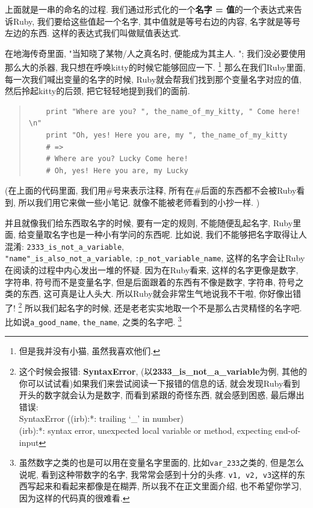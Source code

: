 上面就是一串的命名的过程. 我们通过形式化的一个\textbf{名字 = 值}的一个表达式来告诉Ruby, 我们要给这些值起一个名字, 其中值就是等号右边的内容, 名字就是等号左边的东西. 这样的表达式我们叫做赋值表达式. 

在地海传奇里面, "当知晓了某物/人之真名时, 便能成为其主人. "; 我们没必要使用那么大的杀器, 我只想在呼唤kitty的时候它能够回应一下. \footnote{但是我并没有小猫, 虽然我喜欢他们. } 那么在我们Ruby里面, 每一次我们喊出变量的名字的时候, Ruby就会帮我们找到那个变量名字对应的值, 然后拎起kitty的后颈, 把它轻轻地提到我们的面前. 

\begin{quotation}
  \begin{verbatim}
    print "Where are you? ", the_name_of_my_kitty, " Come here! \n"
    print "Oh, yes! Here you are, my ", the_name_of_my_kitty
    # =>
    # Where are you? Lucky Come here!
    # Oh, yes! Here you are, my Lucky
  \end{verbatim}
\end{quotation}

(在上面的代码里面, 我们用\#号来表示注释, 所有在\#后面的东西都不会被Ruby看到, 所以我们用它来做一些小笔记. 就像不能被老师看到的小抄一样. )

并且就像我们给东西取名字的时候, 要有一定的规则, 不能随便乱起名字, Ruby里面, 给变量取名字也是一种小有学问的东西呢. 比如说, 我们不能够把名字取得让人混淆: \texttt{2333_is_not_a_variable}, \\\texttt{"name"_is_also_not_a_variable}, \texttt{:p_not_variable_name}, 这样的名字会让Ruby在阅读的过程中内心发出一堆的怀疑. 因为在Ruby看来, 这样的名字更像是数字, 字符串, 符号而不是变量名字, 但是后面跟着的东西有不像是数字, 字符串, 符号之类的东西, 这可真是让人头大. 所以Ruby就会非常生气地说我不干啦, 你好像出错了! \footnote{这个时候会报错: \textbf{SyntaxError}, (以\textbf{2333\_is\_not\_a\_variable}为例, 其他的你可以试试看)如果我们来尝试阅读一下报错的信息的话, 就会发现Ruby看到开头的数字就会认为是数字, 而看到紧跟的奇怪东西, 就会感到困惑, 最后爆出错误: \\ SyntaxError ((irb):*: trailing `\_' in number)\\(irb):*: syntax error, unexpected local variable or method, expecting end-of-input} 所以我们起名字的时候, 还是老老实实地取一个不是那么古灵精怪的名字吧. 比如说\texttt{a_good_name}, \texttt{the_name}, 之类的名字吧. \footnote{虽然数字之类的也是可以用在变量名字里面的, 比如\texttt{var_233}之类的, 但是怎么说呢, 看到这种带数字的名字, 我常常会感到十分的头疼. \texttt{v1, v2, v3}这样的东西写起来和看起来都像是在糊弄, 所以我不在正文里面介绍, 也不希望你学习, 因为这样的代码真的很难看. }

